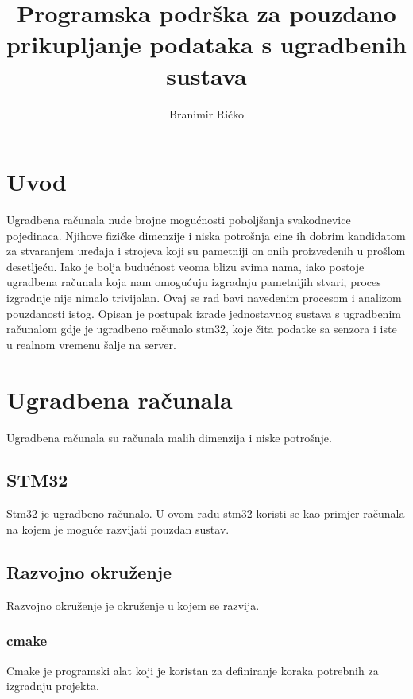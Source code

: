 \documentclass[times, utf8, diplomski]{fer}
\begin{document}

\title{Programska podrška za pouzdano prikupljanje podataka s ugradbenih sustava}

\author{Branimir Ričko}

\maketitle


\tableofcontents

\chapter{Uvod}
Ugradbena računala nude brojne mogućnosti poboljšanja svakodnevice pojedinaca. Njihove fizičke dimenzije i niska potrošnja cine ih dobrim kandidatom za stvaranjem uređaja i strojeva koji su pametniji on onih proizvedenih u prošlom desetljeću. Iako je bolja budućnost veoma blizu svima nama, iako postoje ugradbena računala koja nam omogućuju izgradnju pametnijih stvari, proces izgradnje nije nimalo trivijalan. Ovaj se rad bavi navedenim procesom i analizom pouzdanosti istog. Opisan je postupak izrade jednostavnog sustava s ugradbenim računalom gdje je ugradbeno računalo stm32, koje čita podatke sa senzora i iste u realnom vremenu \v{s}alje na server.

\chapter{Ugradbena računala}
Ugradbena računala su računala malih dimenzija i niske potro\v{s}nje. 

\section{STM32}
Stm32 je ugradbeno računalo. U ovom radu stm32 koristi se kao primjer računala na kojem je moguće razvijati pouzdan sustav.

\section{Razvojno okru\v{z}enje}
Razvojno okru\v{z}enje je okru\v{z}enje u kojem se razvija.

\subsection{cmake}
Cmake je programski alat koji je koristan za definiranje koraka potrebnih za izgradnju projekta.
\end{document}
